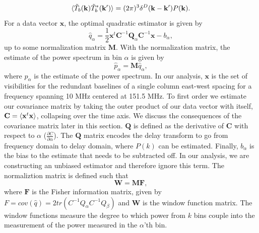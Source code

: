 \documentclass[twocolumn,numberedappendix]{emulateapj} \shorttitle{PSA64}
\newcommand{\x}{\mathbf{x}} \newcommand{\xhat}{\hat{\mathbf{x}}}
\begin{document}
\begin{equation}
\label{eqn:pspec_def}
    \expval{\tilde{T}_{b}(\k)\tilde{T}^{*}_{b}(\k^{\prime})} =
            (2\pi)^{3}\delta^{D}(\k - \k^{\prime})P(\k). 
\end{equation}
For a data vector $\x$, the optimal quadratic estimator is given by 
\begin{equation}
\label{eqn:quad_est}
    \hat{q}_{\alpha} = \frac{1}{2}\x^{t}\mathbf{C}^{-1}\mathbf{Q}_{\alpha}\mathbf{C}^{-1}\x - b_{\alpha},
\end{equation}
up to some normalization matrix $\mathbf{M}$. With the normalization matrix, the
estimate of the power spectrum in bin $\alpha$ is given by
\begin{equation}
    \hat{p}_{\alpha} = \mathbf{M}\hat{q}_{\alpha}, 
\end{equation}
where $\hat{p}_{\alpha}$ is the estimate of the power spectrum.
In our analysis, $\x$ is the set of visibilities for the redundant baselines of
a single column east-west spacing for a frequency spanning 10 MHz centered at
151.5 MHz. To first order we estimate our covariance matrix by taking the outer
product of our data vector with itself, $\mathbf{C} = \expval{\x^{t}\x}$,
collapsing over the time axis. We discuss the consequences of the covariance
matrix later in this section.  $\mathbf{Q}$ is defined as the derivative of
$\mathbf{C}$ with respect to $\alpha$ ($\frac{\partial C}{\partial \alpha}$). The
$\mathbf{Q}$ matrix encodes the delay transform to go from frequency domain to
delay domain, where $P(k)$ can be estimated. Finally, $b_{\alpha}$ is the  bias to
the estimate that needs to be subtracted off. In our analysis, we are
constructing an unbiased estimator and therefore ignore this term. 
The normaliztion matrix is defined such that
\begin{equation}
    \mathbf{W} = \mathbf{M}\mathbf{F}, 
\end{equation}
where $\mathbf{F}$ is the Fisher information matrix, given by $F = cov(\hat{q})
= 2tr(C^{-1}Q_{\alpha}C^{-1}Q_{\beta})$ and $\mathbf{W}$ is 
the window function matrix. The window functions measure the degree to which
power from $k$ bins couple into the measurement of the power measured in the
$\alpha$'th bin.
\end{document}
